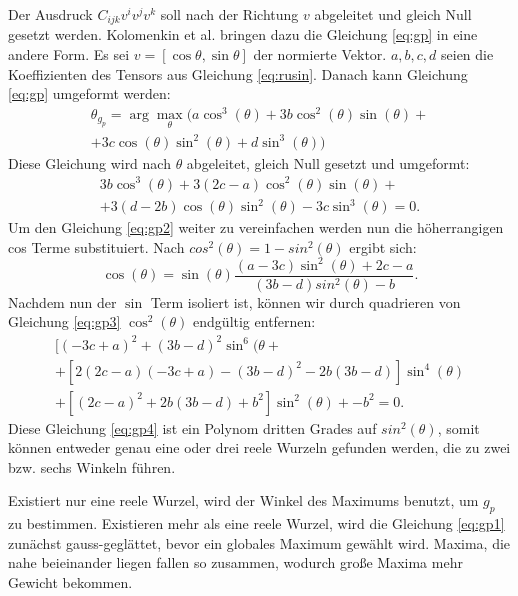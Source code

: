 \documentclass{paperStyle}
\begin{document}
 Der Ausdruck $C_{ijk}v^iv^jv^k$ soll nach der Richtung $v$ abgeleitet und gleich Null gesetzt werden. Kolomenkin et al. bringen dazu die Gleichung \ref{eq:gp} in eine andere Form. Es sei $v=[\cos{\theta}, \sin{\theta}]$ der normierte Vektor. $a, b, c, d$ seien die Koeffizienten des Tensors aus Gleichung \ref{eq:rusin}. Danach kann Gleichung \ref{eq:gp} umgeformt werden:
 \begin{equation}
 \label{eq:gp1}
 \begin{split}
 \theta_{g_p} = \arg\max_{\theta}(a \cos^3{(\theta)} + 3b\cos^2{(\theta)}\sin{(\theta)} +\\
 + 3c\cos{(\theta)}\sin^2{(\theta)} + d\sin^3{(\theta)})
 \end{split}
 \end{equation}
 Diese Gleichung wird nach $\theta$ abgeleitet, gleich Null gesetzt und umgeformt:
 \begin{equation}
 	\label{eq:gp2}
 	\begin{split}
 	3b\cos^3(\theta) + 3(2c - a)\cos^2(\theta)\sin(\theta) + \\
 +	3(d - 2b)\cos(\theta)\sin^2(\theta) - 3c\sin^3(\theta) = 0.
 	\end{split}
 \end{equation}
 Um den Gleichung \ref{eq:gp2} weiter zu vereinfachen werden nun die höherrangigen cos Terme substituiert. Nach $cos^2(\theta) = 1 - sin^2(\theta)$ ergibt sich:
 \begin{equation}	
 \label{eq:gp3}
 \cos(\theta)=\sin(\theta)\frac{(a-3c)\sin^2(\theta)+2c-a}{(3b-d)sin^2(\theta)-b}.
 \end{equation}
 Nachdem nun der $\sin$ Term isoliert ist, können wir durch quadrieren von Gleichung \ref{eq:gp3} $\cos^2(\theta)$ endgültig entfernen:
 \begin{multline}
 \label{eq:gp4}
 	[(-3c+a)^2+(3b-d)^2\sin^6(\theta+\\
  +[2(2c-a)(-3c+a)-(3b-d)^2-2b(3b-d)]\sin^4(\theta) \\
 	+ [(2c-a)^2+2b(3b-d)+b^2]\sin^2(\theta)+-b^2=0.
 \end{multline}
 Diese Gleichung \ref{eq:gp4} ist ein Polynom dritten Grades auf $sin^2(\theta)$, somit können entweder genau eine oder drei reele Wurzeln gefunden werden, die zu zwei bzw. sechs Winkeln führen. 

 Existiert nur eine reele Wurzel, wird der Winkel des Maximums benutzt, um $g_p$ zu bestimmen. Existieren mehr als eine reele Wurzel, wird die Gleichung \ref{eq:gp1} zunächst gauss-geglättet, bevor ein globales Maximum gewählt wird. Maxima, die nahe beieinander liegen fallen so zusammen, wodurch große Maxima mehr Gewicht bekommen. 
 
\end{document}
